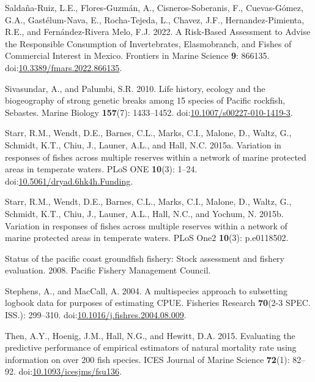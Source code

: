 \documentclass[11pt,
  english,
  letterpaper,
]{article}
\newlength{\cslhangindent}
\newenvironment{CSLReferences}[2] %
 {%
  \setlength{\parindent}{0pt}
  \ifodd #1 \everypar{\setlength{\hangindent}{\cslhangindent}}\ignorespaces\fi
  \ifnum #2 > 0
  \setlength{\parskip}{#2\baselineskip}
  \fi
 }%
 {}
\begin{document}
\begin{CSLReferences}{1}{0}
\leavevmode{}%
Saldaña-Ruiz, L.E., Flores-Guzmán, A., Cisneros-Soberanis, F., Cuevas-Gómez, G.A., Gastélum-Nava, E., Rocha-Tejeda, L., Chavez, J.F., Hernandez-Pimienta, R.E., and Fernández-Rivera Melo, F.J. 2022. A {Risk}-{Based} {Assessment} to {Advise} the {Responsible} {Consumption} of {Invertebrates}, {Elasmobranch}, and {Fishes} of {Commercial} {Interest} in {Mexico}. Frontiers in Marine Science \textbf{9}: 866135. doi:\href{https://doi.org/10.3389/fmars.2022.866135}{10.3389/fmars.2022.866135}.

\leavevmode{}%
Sivasundar, A., and Palumbi, S.R. 2010. Life history, ecology and the biogeography of strong genetic breaks among 15 species of {Pacific} rockfish, {Sebastes}. Marine Biology \textbf{157}(7): 1433--1452. doi:\href{https://doi.org/10.1007/s00227-010-1419-3}{10.1007/s00227-010-1419-3}.

\leavevmode{}%
Starr, R.M., Wendt, D.E., Barnes, C.L., Marks, C.I., Malone, D., Waltz, G., Schmidt, K.T., Chiu, J., Launer, A.L., and Hall, N.C. 2015a. Variation in responses of fishes across multiple reserves within a network of marine protected areas in temperate waters. PLoS ONE \textbf{10}(3): 1--24. doi:\href{https://doi.org/10.5061/dryad.6hk4h.Funding}{10.5061/dryad.6hk4h.Funding}.

\leavevmode{}%
Starr, R.M., Wendt, D.E., Barnes, C.L., Marks, C.I., Malone, D., Waltz, G., Schmidt, K.T., Chiu, J., Launer, A.L., Hall, N.C., and Yochum, N. 2015b. Variation in responses of fishes across multiple reserves within a network of marine protected areas in temperate waters. PLoS One2 \textbf{10}(3): p.e0118502.

\leavevmode{}%
Status of the pacific coast groundfish fishery: Stock assessment and fishery evaluation. 2008. Pacific Fishery Management Council.

\leavevmode{}%
Stephens, A., and MacCall, A. 2004. A multispecies approach to subsetting logbook data for purposes of estimating {CPUE}. Fisheries Research \textbf{70}(2-3 SPEC. ISS.): 299--310. doi:\href{https://doi.org/10.1016/j.fishres.2004.08.009}{10.1016/j.fishres.2004.08.009}.

\leavevmode{}%
Then, A.Y., Hoenig, J.M., Hall, N.G., and Hewitt, D.A. 2015. Evaluating the predictive performance of empirical estimators of natural mortality rate using information on over 200 fish species. ICES Journal of Marine Science \textbf{72}(1): 82--92. doi:\href{https://doi.org/10.1093/icesjms/fsu136}{10.1093/icesjms/fsu136}.


\end{CSLReferences}
\end{document}
